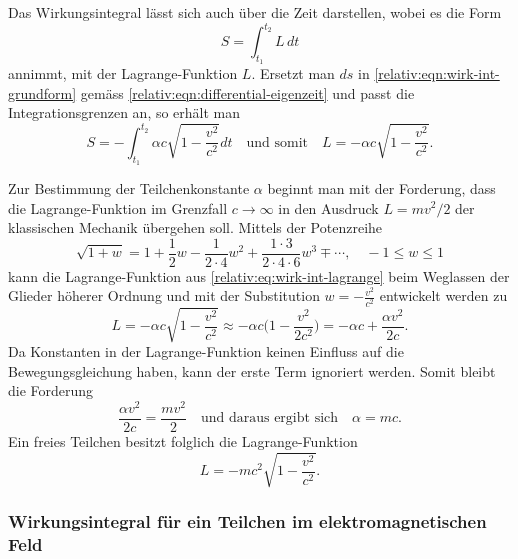 Das Wirkungsintegral lässt sich auch über die Zeit darstellen,
wobei es die Form
\begin{equation}
    S = \int_{t_1}^{t_2} L \, dt
\label{relativ:eqn:wirk-int-zeit}
\end{equation}
annimmt, mit der Lagrange-Funktion \(L\).
Ersetzt man \(ds\) in \eqref{relativ:eqn:wirk-int-grundform}
gemäss \eqref{relativ:eqn:differential-eigenzeit} und passt
die Integrationsgrenzen an, so erhält man
\begin{equation}
    S = -\int_{t_1}^{t_2} \alpha c \sqrt{1-\frac{v^2}{c^2}} dt
    \quad \text{und somit} \quad
    L = -\alpha c \sqrt{1-\frac{v^2}{c^2}}.
    \label{relativ:eq:wirk-int-lagrange}
\end{equation}

Zur Bestimmung der Teilchenkonstante \(\alpha\) beginnt man mit der Forderung,
dass die Lagrange-Funktion im Grenzfall \(c\rightarrow\infty\) in den
Ausdruck \(L=mv^2/2\) der klassischen Mechanik übergehen soll.
Mittels der Potenzreihe
\begin{equation*}
    \sqrt{1+w} = 1 + \frac{1}{2} w - \frac{1}{2\cdot4} w^2 +
    \frac{1\cdot3}{2\cdot4\cdot6} w^3 \mp \cdots, \quad
    -1\leq w \leq1
\end{equation*}
kann die Lagrange-Funktion aus
\eqref{relativ:eq:wirk-int-lagrange} beim Weglassen der
Glieder höherer Ordnung und mit der Substitution
\(w=-\frac{v^2}{c^2}\) entwickelt werden zu
\begin{equation}
    L = - \alpha c \sqrt{1-\frac{v^2}{c^2}}
    \approx -\alpha c \biggl(1 - \frac{v^2}{2c^2}\biggr)
    = -\alpha c + \frac{\alpha v^2}{2c}.
\end{equation}
Da Konstanten in der Lagrange-Funktion keinen Einfluss auf die Bewegungsgleichung haben,
kann der erste Term ignoriert werden. Somit bleibt die Forderung
\begin{equation}
    \frac{\alpha v^2}{2c} = \frac{mv^2}{2}
    \quad \text{und daraus ergibt sich} \quad
    \alpha = mc.
\end{equation}
Ein freies Teilchen besitzt folglich die Lagrange-Funktion
\begin{equation}
    L = -mc^2 \sqrt{1-\frac{v^2}{c^2}}.
\label{relativ:eqn:lagrange-freies-teilchen}
\end{equation}

\subsubsection{Wirkungsintegral für ein Teilchen im elektromagnetischen Feld
\label{relativ:section:wirk-int-em-feld}}

